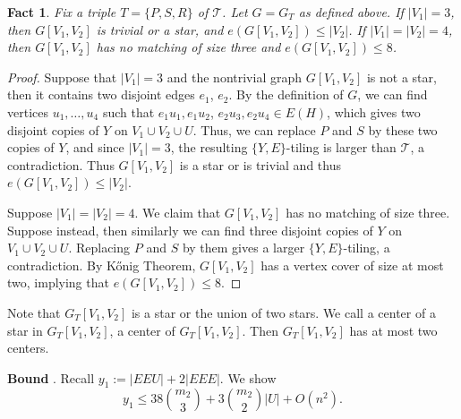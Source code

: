 \documentclass[11pt, reqno]{amsart}    	%
\newtheorem{fact}{Fact}
\theoremstyle{definition}
\def\cT{\mathcal T}
\numberwithin{equation}{section}
\begin{document}
	\begin{fact} \label{f4}
		Fix a triple $T=\{ P,S,R\}$ of $ \cT $. Let $G=G_T$ as defined above. If $	|V_{1}|=3$, then $ G[V_{1},V_{2}] $ is trivial or a star, and $e(G[V_{1},V_{2}])\le|V_{2}|$. 
		If $|V_{1}|=|V_{2}|=4$, then $G[V_{1},V_{2}] $ has no matching of size three and $e(G[V_{1},V_{2}])\le8$. 
	\end{fact}	
	\begin{proof}
		Suppose that $|V_{1}|=3$ and the nontrivial graph $G[V_{1},V_{2}] $ is not a star, then it contains two disjoint edges $e_1$, $e_2$. 
		By the definition of $G$, we can find vertices $u_1,\dots, u_4$ such that $e_1u_1, e_1u_2$, $e_2u_3, e_2u_4\in E(H)$, which gives two disjoint copies of $Y$ on $V_{1} \cup V_{2} \cup U$.
		Thus, we can replace $P$ and $S$ by these two copies of $Y$, and since $|V_1|=3$, the resulting $\{Y, E\}$-tiling is larger than $\cT$, a contradiction. 
		Thus $ G[V_{1},V_{2}] $ is a star or is trivial and thus $e(G[V_{1},V_{2}])\le|V_{2}|$.
		
		Suppose $|V_{1}|=|V_{2}|=4$. %
		We claim that $G[V_{1},V_{2}]$ has no matching of size three. Suppose instead, then similarly we can find three disjoint copies of $Y$ on $V_{1} \cup V_{2} \cup U$.
		Replacing $P$ and $S$ by them gives a larger $\{Y, E\}$-tiling, a contradiction. 
		By K\H onig Theorem\cite{2000Graph}, $G[V_{1},V_{2}]$ has a vertex cover of size at most two, implying that $ e(G[V_{1},V_{2}])\le 8 $.
	\end{proof}
	
	Note that $ G_{T}[V_{1},V_{2}] $ is a star or the union of two stars. We call a center of a star in  $ G_{T}[V_{1},V_{2}] $, a center of $G_{T}[V_{1},V_{2}] $. Then $G_{T}[V_{1},V_{2}] $ has at most two centers.
	

	
	\noindent\textbf{Bound} .
Recall $y_{1}:= |EEU|+2|EEE|$.
	We show
	\[y_{1} \le  38\binom{m_2}{3}+3\binom{m_2}{2}|U|+O(n^2).\]
	
\end{document}
